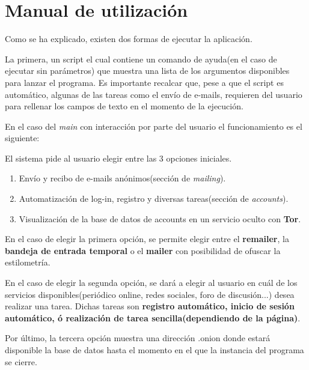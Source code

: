 \chapter{Manual de utilización}
\label{Anexo:manualuso}

Como se ha explicado, existen dos formas de ejecutar la aplicación. 

La primera, un script el cual contiene un comando de ayuda(en el caso de ejecutar sin parámetros) que muestra una lista de los argumentos disponibles para lanzar el programa. Es importante recalcar que, pese a que el script es automático, algunas de las tareas como el envío de e-mails, requieren del usuario para rellenar los campos de texto en el momento de la ejecución.

En el caso del \textit{main} con interacción por parte del usuario el funcionamiento es el siguiente:

El sistema pide al usuario elegir entre las 3 opciones iniciales.
\begin{enumerate}
	\item {Envío y recibo de e-mails anónimos(sección de \textit{mailing}).}
	
	\item {Automatización de log-in, registro y diversas tareas(sección de \textit{accounts})}.
	
	\item {Visualización de la base de datos de accounts en un servicio oculto con \textbf{Tor}}.
\end{enumerate}

En el caso de elegir la primera opción, se permite elegir entre el \textbf{remailer}, la \textbf{bandeja de entrada temporal} o el \textbf{mailer} con posibilidad de ofuscar la estilometría.

En el caso de elegir la segunda opción, se dará a elegir al usuario en cuál de los servicios disponibles(periódico online, redes sociales, foro de discusión...) desea realizar una tarea. Dichas tareas son \textbf{registro automático, inicio de sesión automático, ó realización de tarea sencilla(dependiendo de la página)}.

Por último, la tercera opción muestra una dirección .onion donde estará disponible la base de datos hasta el momento en el que la instancia del programa se cierre.